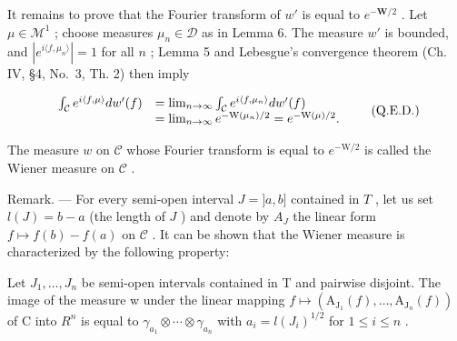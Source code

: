 It remains to prove that the Fourier transform of \(w'\) is equal to \(e^{-\mathbf{W}/2}\) . Let \(\mu \in \mathcal{M}^1\) ; choose measures \(\mu_n \in \mathcal{D}\) as in Lemma 6. The measure \(w'\) is bounded, and \(|e^{i\langle f,\mu_n\rangle}| = 1\) for all \(n\) ; Lemma 5 and Lebesgue's convergence theorem (Ch. IV, §4, No.~3, Th. 2) then imply

\[
\begin{array}{r l} \int_ {\mathcal {C}} e ^ {i \langle f, \mu \rangle} d w ^ {\prime} (f) & = \lim _ {n \to \infty} \int_ {\mathcal {C}} e ^ {i \langle f, \mu_ {n} \rangle} d w ^ {\prime} (f) \\ & = \lim _ {n \to \infty} e ^ {- \mathrm{W} (\mu_ {n}) / 2} = e ^ {- \mathrm{W} (\mu) / 2}. \end{array}\tag{Q.E.D.}
\]

The measure \(w\) on \(\mathcal{C}\) whose Fourier transform is equal to \(e^{-\mathrm{W} / 2}\) is called the Wiener measure on \(\mathcal{C}\) .

Remark. --- For every semi-open interval \(J = ]a, b]\) contained in \(T\) , let us set \(l(J) = b - a\) (the length of \(J\) ) and denote by \(A_J\) the linear form \(f \mapsto f(b) - f(a)\) on \(\mathcal{C}\) . It can be shown that the Wiener measure is characterized by the following property:

Let \(J_{1},\ldots,J_{n}\) be semi-open intervals contained in T and pairwise disjoint. The image of the measure w under the linear mapping \(f\mapsto\left(\mathrm{A}_{\mathrm{J}_{1}}(f),\ldots,\mathrm{A}_{\mathrm{J}_{n}}(f)\right)\) of C into \(R^{n}\) is equal to \(\gamma_{a_{1}}\otimes\cdots\otimes\gamma_{a_{n}}\) with \(a_{i}=l(J_{i})^{1/2}\) for \(1\leqslant i\leqslant n\) .

